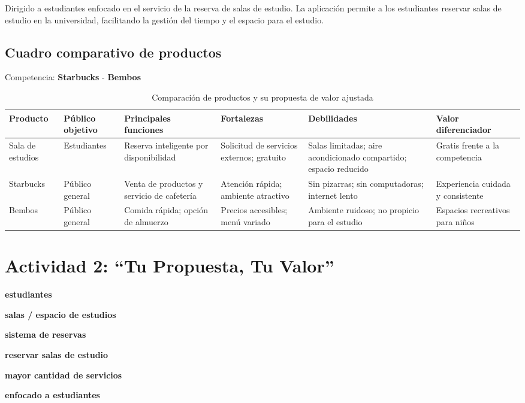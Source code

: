 \documentclass{article}
\begin{document}
Dirigido a estudiantes enfocado en el servicio de la reserva de salas de estudio. La aplicación permite a los estudiantes reservar salas de estudio en la universidad, facilitando la gestión del tiempo y el espacio para el estudio.

\subsection{Cuadro comparativo de productos}

Competencia: \textbf{Starbucks} - \textbf{Bembos}

\begin{table}[ht]
  \centering
  \scriptsize
  \begin{tabularx}{\textwidth}{|>{\raggedright\arraybackslash}X|>{\raggedright\arraybackslash}X|>{\raggedright\arraybackslash}X|>{\raggedright\arraybackslash}X|>{\raggedright\arraybackslash}X|>{\raggedright\arraybackslash}X|}
  \hline
  \textbf{Producto} & \textbf{Público objetivo} & \textbf{Principales funciones} & \textbf{Fortalezas} & \textbf{Debilidades} & \textbf{Valor diferenciador} \\
  \hline
  Sala de estudios & Estudiantes  & Reserva inteligente por disponibilidad  & Solicitud de servicios externos; gratuito  & Salas limitadas; aire acondicionado compartido; espacio reducido  & Gratis frente a la competencia  \\
  \hline
  Starbucks & Público general  & Venta de productos y servicio de cafetería  & Atención rápida; ambiente atractivo  & Sin pizarras; sin computadoras; internet lento  & Experiencia cuidada y consistente  \\
  \hline
  Bembos & Público general  & Comida rápida; opción de almuerzo  & Precios accesibles; menú variado  & Ambiente ruidoso; no propicio para el estudio  & Espacios recreativos para niños  \\
  \hline
  \end{tabularx}
  \caption{Comparación de productos y su propuesta de valor ajustada}
  \label{tab:comparacion-productos}
  \end{table}
  
\newpage

\section{Actividad 2: “Tu Propuesta, Tu Valor”}

\begin{description}[leftmargin=2cm,style=nextline]
  \item[Para] \textbf{estudiantes}
  \item[que necesitan] \textbf{salas / espacio de estudios}
  \item[nuestra solución es] \textbf{sistema de reservas}
  \item[que ofrece] \textbf{reservar salas de estudio}
  \item[a diferencia de] \textbf{mayor cantidad de servicios}
  \item[porque] \textbf{enfocado a estudiantes}
\end{description}
\end{document}

